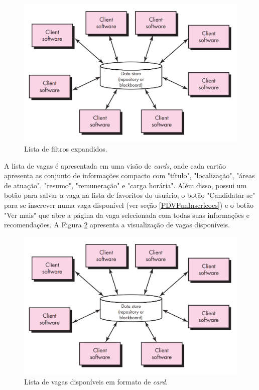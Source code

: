 \documentclass[cic,tc]{iiufrgs}
\begin{document}
\begin{figure}[ht]
    \caption{Lista de filtros expandidos.}
        \begin{center}
            \includegraphics[width=1\textwidth]{figuras/arquitetura-centralizada-dados.png}
        \end{center}
    \label{telaFiltros}
\end{figure}

A lista de vagas é apresentada em uma visão de \textit{cards}, onde cada cartão apresenta as conjunto de informações compacto com "título", "localização", "áreas de atuação", "resumo", "remuneração" e "carga horária". Além disso, possui um botão para salvar a vaga na lista de favoritos do usuário; o botão "Candidatar-se" para se inscrever numa vaga disponível (ver seção \ref{PDVFunInscricoes}) e o botão "Ver mais" que abre a página da vaga selecionada com todas suas informações e recomendações. A Figura \ref{telaVagasLista} apresenta a visualização de vagas disponíveis.

\begin{figure}[ht]
    \caption{Lista de vagas disponíveis em formato de \textit{card}.}
        \begin{center}
            \includegraphics[width=1\textwidth]{figuras/arquitetura-centralizada-dados.png}
        \end{center}
    \label{telaVagasLista}
\end{figure}
\end{document}
